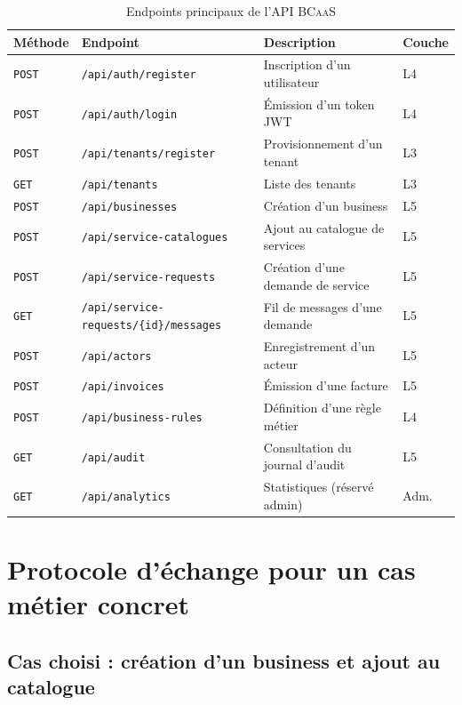 \documentclass[12pt,a4paper]{report}
\theoremstyle{definition}
\theoremstyle{remark}
\newcommand{\bcaas}{\textsc{BCaaS}}
\newcommand{\api}{\textsc{API}}
\newcommand{\jwt}{\textsc{JWT}}
\begin{document}
\begin{table}[h]
	\centering
	\caption{Endpoints principaux de l'\api{} \bcaas}
	\label{tab:endpoints}
	\begin{tabularx}{\textwidth}{llXl}
		\toprule
		\textbf{Méthode} & \textbf{Endpoint} & \textbf{Description} & \textbf{Couche} \\
		\midrule
		\texttt{POST} & \texttt{/api/auth/register} & Inscription d'un utilisateur & L4 \\
		\texttt{POST} & \texttt{/api/auth/login} & Émission d'un token \jwt & L4 \\
		\texttt{POST} & \texttt{/api/tenants/register} & Provisionnement d'un tenant & L3 \\
		\texttt{GET}  & \texttt{/api/tenants} & Liste des tenants & L3 \\
		\texttt{POST} & \texttt{/api/businesses} & Création d'un business & L5 \\
		\texttt{POST} & \texttt{/api/service-catalogues} & Ajout au catalogue de services & L5 \\
		\texttt{POST} & \texttt{/api/service-requests} & Création d'une demande de service & L5 \\
		\texttt{GET}  & \texttt{/api/service-requests/\{id\}/messages} & Fil de messages d'une demande & L5 \\
		\texttt{POST} & \texttt{/api/actors} & Enregistrement d'un acteur & L5 \\
		\texttt{POST} & \texttt{/api/invoices} & Émission d'une facture & L5 \\
		\texttt{POST} & \texttt{/api/business-rules} & Définition d'une règle métier & L4 \\
		\texttt{GET}  & \texttt{/api/audit} & Consultation du journal d'audit & L5 \\
		\texttt{GET}  & \texttt{/api/analytics} & Statistiques (réservé admin) & Adm. \\
		\bottomrule
	\end{tabularx}
\end{table}

\chapter{Protocole d'échange pour un cas métier concret}
\label{chap:protocole}

\section{Cas choisi : création d'un business et ajout au catalogue}
\end{document}

